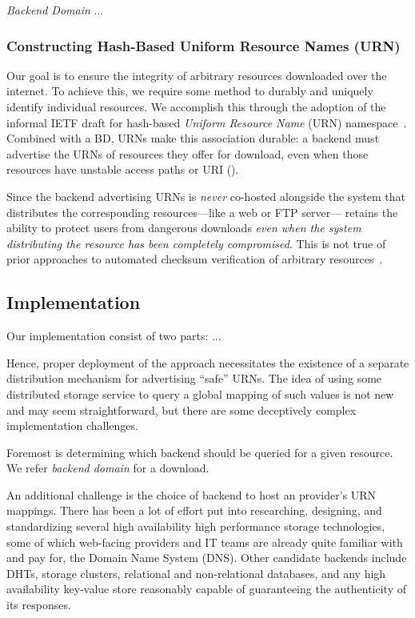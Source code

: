 \emph{Backend Domain} ...

\subsubsection{Constructing Hash-Based Uniform Resource Names (URN)}

Our goal is to ensure the integrity of arbitrary resources downloaded over the
internet. To achieve this, we require some method to durably and uniquely
identify individual resources. We accomplish this through the adoption of the
informal IETF draft for hash-based \emph{Uniform Resource Name} (URN)
namespace~\cite{draft-URN}. Combined with a BD, URNs make this association
durable: a backend must advertise the URNs of resources they offer for download,
even when those resources have unstable access paths or URI ().

Since the backend advertising URNs is \emph{never} co-hosted alongside the
system that distributes the corresponding resources---like a web or FTP
server---\SYSTEM{} retains the ability to protect users from dangerous downloads
\emph{even when the system distributing the resource has been completely
compromised}. This is not true of prior approaches to automated checksum
verification of arbitrary resources~\cite{Cherubini}.

\subsection{Implementation}



Our \SYSTEM{} implementation consist of two parts: ...

Hence, proper deployment of the \SYSTEM{} approach necessitates the existence of
a separate distribution mechanism for advertising ``safe'' URNs. The idea of
using some distributed storage service to query a global mapping of such values
is not new and may seem straightforward, but there are some deceptively complex
implementation challenges.

Foremost is determining which backend should be queried for a
given resource. We refer \emph{backend domain} for a download. 

An additional challenge is the choice of backend to host an
provider's URN mappings. There has been a lot of effort put into researching,
designing, and standardizing several high availability high performance storage
technologies, some of which web-facing providers and IT teams are already quite
familiar with and pay for, \eg the Domain Name System (DNS). Other candidate
backends include DHTs, storage clusters, relational and
non-relational databases, and any high availability key-value store reasonably
capable of guaranteeing the authenticity of its responses.

